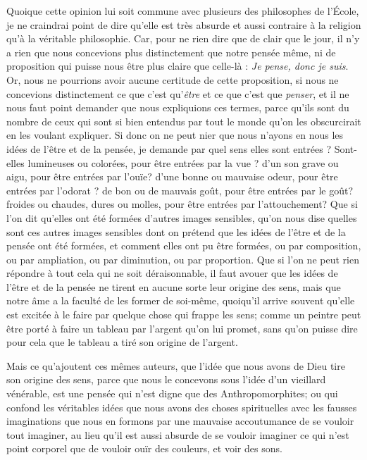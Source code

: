 Quoique cette opinion lui soit commune avec plusieurs des philosophes de l'École, je ne craindrai point de dire qu'elle est très absurde et aussi contraire à la religion qu'à la véritable philosophie. Car, pour ne rien dire que de clair que le jour, il n'y a rien que nous concevions plus distinctement que notre pensée même, ni de proposition qui puisse nous être plus claire que celle-là : \emph{Je pense, donc je suis}. Or, nous ne pourrions avoir aucune certitude de cette proposition, si nous ne concevions distinctement ce que c'est qu'\emph{être} et ce que c'est que \emph{penser}, et il ne nous faut point demander que nous expliquions ces termes, parce qu'ils sont du nombre de ceux qui sont si bien entendus par tout le monde qu'on les obscurcirait en les voulant expliquer. Si donc on ne peut nier que nous n'ayons en nous les idées de l'être et de la pensée, je demande par quel sens elles sont entrées ? Sont-elles lumineuses ou colorées, pour être entrées par la vue ? d'un son grave ou aigu, pour être entrées par l'ouïe? d'une bonne ou mauvaise odeur, pour être entrées par l'odorat ? de bon ou de mauvais goût, pour être entrées par le goût? froides ou chaudes, dures ou molles, pour être entrées par l'attouchement? Que si l'on dit qu'elles ont été formées d'autres images sensibles, qu'on nous dise quelles sont ces autres images sensibles dont on prétend que les idées de l'être et de la pensée ont été formées, et comment elles ont pu être formées, ou par composition, ou par ampliation, ou par diminution, ou par proportion. Que si l'on ne peut rien répondre à tout cela qui ne soit déraisonnable, il faut avouer que les idées de l'être et de la pensée ne tirent en aucune sorte leur origine des sens, mais que notre âme a la faculté de les former de soi-même, quoiqu'il arrive souvent qu'elle est excitée à le faire par quelque chose qui frappe les sens; comme un peintre peut être porté à faire un tableau par l'argent qu'on lui promet, sans qu'on puisse dire pour cela que le tableau a tiré son origine de l'argent.

Mais ce qu'ajoutent ces mêmes auteurs, que l'idée que nous avons de Dieu tire son origine des sens, parce que nous le concevons sous l'idée d'un vieillard vénérable, est une pensée qui n'est digne que des Anthropomorphites; ou qui confond les véritables idées que nous avons des choses spirituelles avec les fausses imaginations que nous en formons par une mauvaise accoutumance de se vouloir tout imaginer, au lieu qu'il est aussi absurde de se vouloir imaginer ce qui n'est point corporel que de vouloir ouïr des couleurs, et voir des sons.

